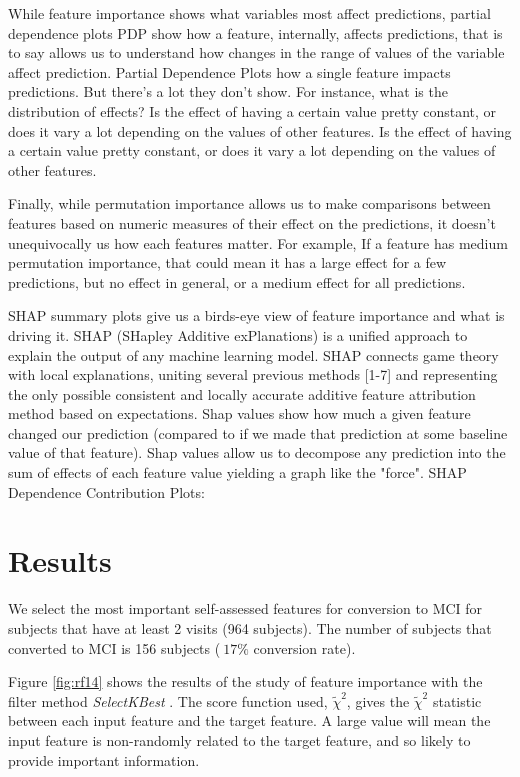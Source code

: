 \documentclass[preprint,12pt]{elsarticle}
\begin{document}

While feature importance shows what variables most affect predictions, partial dependence plots PDP show how a feature, internally, affects predictions, that is to say allows us to understand how changes in the range of values of the variable affect prediction. Partial Dependence Plots how a single feature impacts predictions. But there's a lot they don't show. For instance, what is the distribution of effects? Is the effect of having a certain value pretty constant, or does it vary a lot depending on the values of other features.  Is the effect of having a certain value pretty constant, or does it vary a lot depending on the values of other features.

Finally, while permutation importance allows us to  make comparisons between features based on numeric measures of their effect on the predictions, it doesn't unequivocally  us how each features matter. For example, 
If a feature has medium permutation importance, that could mean it has a large effect for a few predictions, but no effect in general, or a medium effect for all predictions.

SHAP summary plots give us a birds-eye view of feature importance and what is driving it. SHAP (SHapley Additive exPlanations) is a unified approach to explain the output of any machine learning model. SHAP connects game theory with local explanations, uniting several previous methods [1-7] and representing the only possible consistent and locally accurate additive feature attribution method based on expectations.
Shap values show how much a given feature changed our prediction (compared to if we made that prediction at some baseline value of that feature).
Shap values allow us to decompose any prediction into the sum of effects of each feature value yielding a graph like the "force". SHAP Dependence Contribution Plots: 


\section{Results}
\label{se:res}

We select the most important self-assessed features for conversion to MCI for subjects that have at least 2 visits (964 subjects). The number of subjects that converted to MCI is 156 subjects ($~17\%$ conversion rate). 


Figure \ref{fig:rf14} shows the results of the study of feature importance with the filter method \emph{SelectKBest} \cite{scikit-learn}. The score function used, $\tilde{\chi}^2$, gives the $\tilde{\chi}^2$ statistic between each input feature and the target feature. A large value will mean the input feature is non-randomly related to the target feature, and so likely to provide important information.
\end{document}

